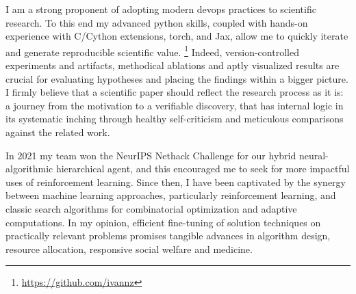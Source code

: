 \documentclass[12pt]{letter}
\begin{document}
I am a strong proponent of adopting modern devops practices to scientific research. To this end my advanced python skills, coupled with hands-on experience with C/Cython extensions, torch, and Jax, allow me to quickly iterate and generate reproducible scientific value.%
\footnote{
    \url{https://github.com/ivannz}
}
Indeed, version-controlled experiments and artifacts, methodical ablations and aptly visualized results are crucial for evaluating hypotheses and placing the findings within a bigger picture. I firmly believe that a scientific paper should reflect the research process as it is: a journey from the motivation to a verifiable discovery, that has internal logic in its systematic inching through healthy self-criticism and meticulous comparisons against the related work.
\par\medskip
% 

In 2021 my team won the NeurIPS Nethack Challenge for our hybrid neural-algorithmic hierarchical agent, and this encouraged me to seek for more impactful uses of reinforcement learning. Since then, I have been captivated by the synergy between machine learning approaches, particularly reinforcement learning, and classic search algorithms for combinatorial optimization and adaptive computations. In my opinion, efficient fine-tuning of solution techniques on practically relevant problems promises tangible advances in algorithm design, resource allocation, responsive social welfare and medicine.
\par\medskip


\end{document}
